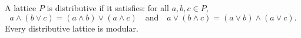A lattice $P$ is distributive if it satisfies: for all $a, b, c \in P$,
$$a \wedge (b \vee c) = (a \wedge b) \vee (a \wedge c) \quad \text{and} \quad a \vee (b \wedge c) = (a \vee b) \wedge (a \vee c).$$
Every distributive lattice is modular.
